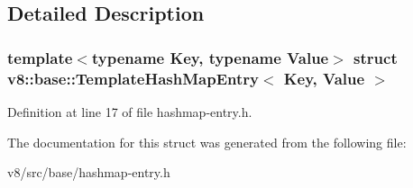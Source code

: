 \subsection{Detailed Description}
\subsubsection*{template$<$typename Key, typename Value$>$\newline
struct v8\+::base\+::\+Template\+Hash\+Map\+Entry$<$ Key, Value $>$}



Definition at line 17 of file hashmap-\/entry.\+h.



The documentation for this struct was generated from the following file\+:\begin{DoxyCompactItemize}
\item 
v8/src/base/hashmap-\/entry.\+h\end{DoxyCompactItemize}
